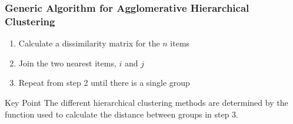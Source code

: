 \documentclass{beamer}
\begin{document}
{ 

}

\begin{frame}
  \frametitle{Generic Algorithm for Agglomerative Hierarchical Clustering}


\begin{enumerate}
  \item Calculate a dissimilarity matrix for the $n$ items
  
  \item Join the two nearest items, $i$ and $j$


  \item Repeat from step 2 until there is a single group
\end{enumerate}

\begin{block}{Key Point}
 The different hierarchical clustering methods are determined by the function used to calculate the distance between groups in step 3.
\end{block}

\end{frame}
\end{document}
